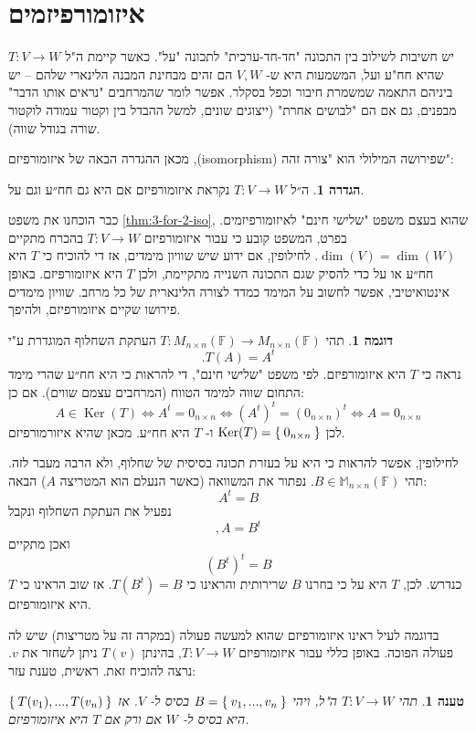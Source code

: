 \documentclass[12pt]{report}
\theoremstyle{plain}
\newtheorem{proposition}[theorem]{טענה}
\theoremstyle{definition}
\newtheorem{definition}[theorem]{הגדרה}
\newtheorem{example}{דוגמה}[chapter]
\newcommand{\F}{\mathbb{F}}
\newcommand{\M}{\mathbb{M}}
\newcommand{\0}{\mathbf{0}}
\DeclareMathOperator{\Ker}{Ker}
\begin{document}
\section{איזומורפיזמים}

יש חשיבות לשילוב בין התכונה "חד-חד-ערכית" לתכונה "על". כאשר קיימת ה"ל 
$T:V\to W$
שהיא חח"ע ועל, המשמעות היא ש-
$V,W$
הם זהים מבחינת המבנה הלינארי שלהם – יש ביניהם התאמה שמשמרת חיבור וכפל בסקלר. אפשר לומר שהמרחבים "נראים אותו הדבר" מבפנים, גם אם הם "לבושים אחרת" (ייצוגים שונים, למשל ההבדל בין וקטור עמודה לוקטור שורה בגודל שווה).


מכאן ההגדרה הבאה של איזומורפיזם
,(isomorphism)
שפירושה המילולי הוא "צורה זהה":

\begin{definition}
ה״ל
$T:V\to W$
נקראת איזומורפיזם אם היא גם חח״ע וגם על.
\end{definition}

כבר הוכחנו את משפט
\ref{thm:3-for-2-iso},
שהוא בעצם משפט "שלישי חינם" לאיזומורפיזמים. בפרט, המשפט קובע כי עבור איזומורפיזם 
$T:V\to W$
בהכרח מתקיים
$\dim(V)=\dim(W)$.
לחילופין, אם ידוע שיש שוויון מימדים, אז די להוכיח
כי $T$
היא חח״ע או על כדי להסיק שגם התכונה השנייה מתקיימת, ולכן 
$T$
היא איזומורפיזם. באופן אינטואיטיבי, אפשר לחשוב על המימד כמדד לצורה הלינארית של כל מרחב. שוויון מימדים פירושו שקיים איזומורפיזם, ולהיפך.

\begin{example}
תהי
$T:M_{n\times n}(\F)\to M_{n\times n}(\F)$
העתקת השחלוף המוגדרת ע"י
$$
.T(A)=A^t
$$
נראה כי 
$T$
היא איזומורפיזם. לפי משפט "שלישי חינם", די להראות כי היא 
חח״ע שהרי מימד התחום שווה למימד הטווח (המרחבים עצמם שווים). אם כן:
$$
A\in\Ker(T) \iff A^t=0_{n\times n} \iff (A^t)^t=(0_{n\times n})^t \iff A=0_{n\times n}
$$
לכן
$\Ker(T)=\Set{0_{n\times n}}$
ו-
$T$
היא חח״ע. מכאן שהיא איזורמורפיזם.

לחילופין, אפשר להראות כי היא על בעזרת תכונה בסיסית של שחלוף, ולא הרבה מעבר לזה.
תהי
$B\in\M_{n\times n}(\F)$.
נפתור את המשוואה (כאשר הנעלם הוא המטריצה 
$A$)
הבאה:
$$
A^t=B
$$
נפעיל את העתקת השחלוף ונקבל
$$
,A=B^t
$$
ואכן מתקיים
$$
(B^t)^t=B
$$
כנדרש. לכן,
$T$
היא על כי בחרנו
$B$
שרירותית והראינו כי
$T(B^t)=B$.
אז שוב הראינו כי 
$T$
היא איזומורפיזם.
\end{example}

בדוגמה לעיל ראינו איזומורפיזם שהוא למעשה פעולה (במקרה זה על מטריצות) שיש לה פעולה הפוכה. באופן כללי עבור איזומורפיזם
$T:V\to W$,
בהינתן
$T(v)$
ניתן לשחזר את 
$v$.
נרצה להוכיח זאת. ראשית, טענת עזר:

\begin{proposition}\label{prop:iso-by-basis}
תהי 
$T:V\to W$
ה"ל, ויהי
$B=\Set{v_1,...,v_n}$
בסיס ל-
$V$.
אז 
$\Set{T(v_1),...,T(v_n)}$
היא בסיס ל-
$W$
אם ורק אם
$T$
היא איזומורפיזם.
\end{proposition}
\end{document}
